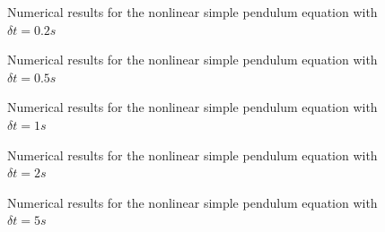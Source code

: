 \documentclass[a4paper,11pt]{report}
\begin{document}
\begin{enumerate}
    \begin{figure}[H]
    \centering
    \resizebox{0.95\linewidth}{!}{}
    \caption{Numerical results for the nonlinear simple pendulum equation
    with $\delta t = 0.2s$}
    \end{figure}

    \begin{figure}[H]
    \centering
    \resizebox{0.95\linewidth}{!}{}
    \end{figure}

    \begin{figure}[H]
    \centering
    \resizebox{0.95\linewidth}{!}{}
    \caption{Numerical results for the nonlinear simple pendulum equation
    with $\delta t = 0.5s$}
    \end{figure}

    \begin{figure}[H]
    \centering
    \resizebox{0.95\linewidth}{!}{}
    \end{figure}
    
    \begin{figure}[H]
    \centering
    \resizebox{0.95\linewidth}{!}{}
    \caption{Numerical results for the nonlinear simple pendulum equation
    with $\delta t = 1s$}
    \end{figure}

    \begin{figure}[H]
    \centering
    \resizebox{0.95\linewidth}{!}{}
    \end{figure}

    \begin{figure}[H]
    \centering
    \resizebox{0.95\linewidth}{!}{}
    \caption{Numerical results for the nonlinear simple pendulum equation
    with $\delta t = 2s$}
    \end{figure}

    \begin{figure}[H]
    \centering
    \resizebox{0.95\linewidth}{!}{}
    \end{figure}

    \begin{figure}[H]
    \centering
    \resizebox{0.95\linewidth}{!}{}
    \caption{Numerical results for the nonlinear simple pendulum equation
    with $\delta t = 5s$}
    \end{figure}


\end{enumerate}
\end{document}
